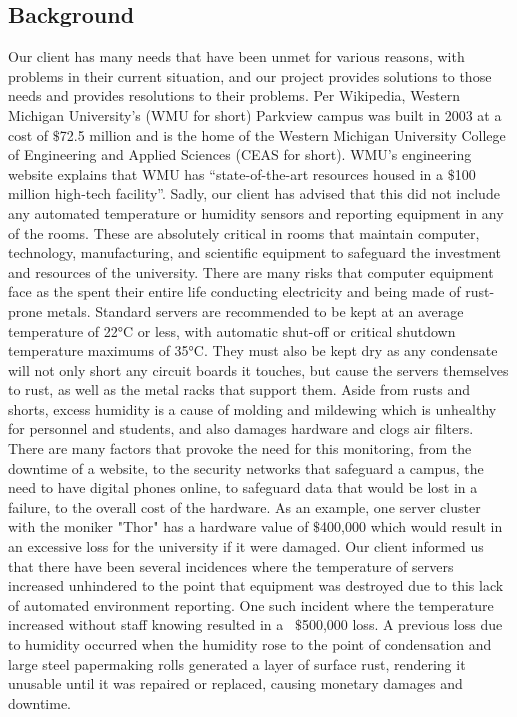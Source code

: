 \documentclass{report}
\begin{document}
\subsection*{Background}
Our client has many needs that have been unmet for various reasons, with problems in their current situation, and our project provides solutions to those needs and provides resolutions to their problems.
\newline
\indent
  Per Wikipedia, Western Michigan University's (WMU for short) Parkview campus was built in 2003 at a cost of $\$$72.5 million and is the home of the Western Michigan University College of Engineering and Applied Sciences (CEAS for short). 
 WMU’s engineering website explains that WMU has “state-of-the-art resources housed in a $\$$100 million high-tech facility”. 
Sadly, our client has advised that this did not include any automated temperature or humidity sensors and reporting equipment in any of the rooms. 
 These are absolutely critical in rooms that maintain computer, technology, manufacturing, and scientific equipment to safeguard the investment and resources of the university.  There are many risks that computer equipment face as the spent their entire life conducting electricity and being made of rust-prone metals. Standard servers are recommended to be kept at an average temperature of 22°C or less, with automatic shut-off or critical shutdown temperature maximums of 35°C. They must also be kept dry as any condensate will not only short any circuit boards it touches, but cause the servers themselves to rust, as well as the metal racks that support them. Aside from rusts and shorts, excess humidity is a cause of molding and mildewing which is unhealthy for personnel and students, and also damages hardware and clogs air filters. There are many factors that provoke the need for this monitoring, from the downtime of a website, to the security networks that safeguard a campus, the need to have digital phones online, to safeguard data that would be lost in a failure, to the overall cost of the hardware. As an example, one server cluster with the moniker "Thor" has a hardware value of $\$$400,000 which would result in an excessive loss for the university if it were damaged. 
 Our client informed us that there have been several incidences where the temperature of servers increased unhindered to the point that equipment was destroyed due to this lack of automated environment reporting. One such incident where the temperature increased without staff knowing resulted in a ~$\$$500,000 loss. A previous loss due to humidity occurred when the humidity rose to the point of condensation and large steel papermaking rolls generated a layer of surface rust, rendering it unusable until it was repaired or replaced, causing monetary damages and downtime. 
\end{document}
